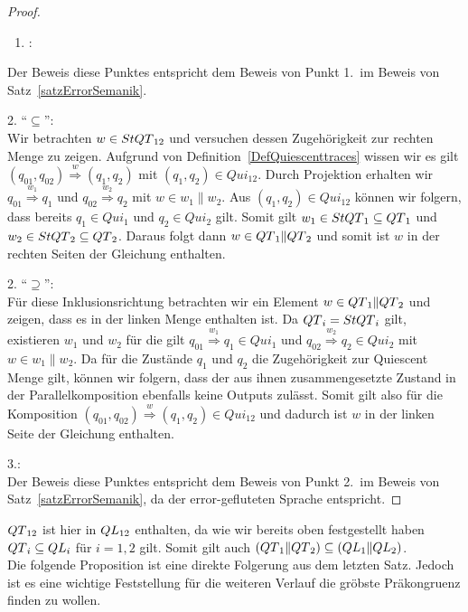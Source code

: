 \begin{proof}
  ~
  \begin{enumerate}
    \item \hspace{-0.2cm}:
  \end{enumerate}
  \vspace{-0.3cm}
  Der Beweis diese Punktes entspricht dem Beweis von Punkt 1.\ im Beweis von
  Satz~\ref{satzErrorSemanik}.

  2. ``$\subseteq$'':\\
  Wir betrachten $w\in StQT{}_{12}$ und versuchen dessen
  Zugehörigkeit zur rechten Menge zu zeigen. Aufgrund von
  Definition~\ref{DefQuiescenttraces} wissen wir es gilt $(q_{01},q_{02})
  \overset{w}{\Rightarrow} (q_1,q_2)$ mit $(q_1,q_2)\in Qui_{12}$. Durch
  Projektion erhalten wir $q_{01} \overset{w_1}{\Rightarrow} q_1$ und $q_{02}
  \overset{w_2}{\Rightarrow} q_2$ mit $w\in w_1\|w_2$. Aus $(q_1,q_2)\in
  Qui_{12}$ können wir folgern, dass bereits $q_1\in Qui_1$ und $q_2\in
  Qui_2$ gilt. Somit gilt $w_1\in StQT{}_1\subseteq QT{}_1$ und $w_2\in
  StQT{}_2\subseteq QT{}_2$. Daraus folgt dann $w\in QT{}_1\|QT{}_2$ und somit ist $w$
  in der rechten Seiten der Gleichung enthalten.

  2. ``$\supseteq$'':\\
  Für diese Inklusionsrichtung betrachten wir ein Element $w\in QT{}_1\|QT{}_2$ und
  zeigen, dass es in der linken Menge enthalten ist. Da $QT{}_i = StQT{}_i$ gilt,
  existieren $w_1$ und $w_2$ für die gilt $q_{01} \overset{w_1}{\Rightarrow}
  q_1\in Qui_1$ und $q_{02} \overset{w_2}{\Rightarrow} q_2\in Qui_2$ mit $w\in
  w_1\| w_2$. Da für die Zustände $q_1$ und $q_2$ die Zugehörigkeit zur
  Quiescent Menge gilt, können wir folgern, dass der aus ihnen zusammengesetzte
  Zustand in der Parallelkomposition ebenfalls keine Outputs zulässt. Somit
  gilt also für die Komposition $(q_{01},q_{02}) \overset{w}{\Rightarrow}
  (q_1,q_2)\in Qui_{12}$ und dadurch ist $w$ in der linken Seite der Gleichung
  enthalten.

  3.:\\
  Der Beweis diese Punktes entspricht dem Beweis von Punkt 2.\ im Beweis von
  Satz~\ref{satzErrorSemanik}, da \QL{} der error-gefluteten Sprache \EL{}
  entspricht.
\end{proof}

$QT{}_{12}$ ist hier in $QL{}_{12}$ enthalten, da wie wir bereits oben festgestellt
haben $QT{}_i\subseteq QL{}_i$ für $i=1,2$ gilt. Somit gilt auch
$(QT{}_1\|QT{}_2)\subseteq (QL{}_1\|QL{}_2)$.\\
Die folgende Proposition ist eine direkte Folgerung aus dem letzten Satz.
Jedoch ist es eine wichtige Feststellung für die weiteren Verlauf die gröbste
Präkongruenz finden zu wollen.

